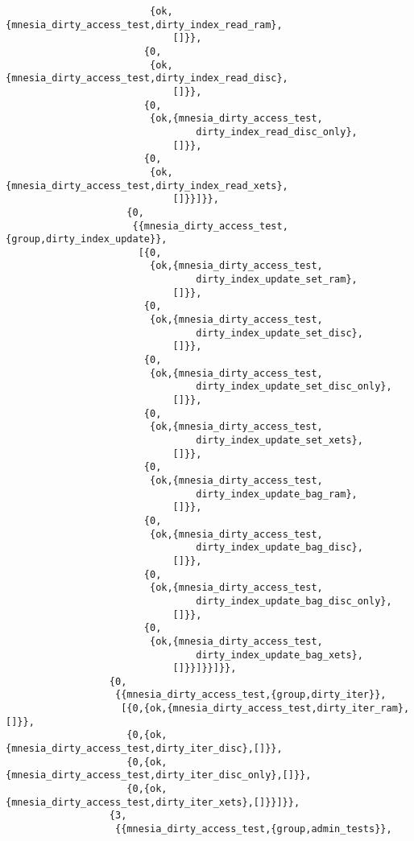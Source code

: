 \begin{verbatim}
                         {ok,{mnesia_dirty_access_test,dirty_index_read_ram},
                             []}},
                        {0,
                         {ok,{mnesia_dirty_access_test,dirty_index_read_disc},
                             []}},
                        {0,
                         {ok,{mnesia_dirty_access_test,
                                 dirty_index_read_disc_only},
                             []}},
                        {0,
                         {ok,{mnesia_dirty_access_test,dirty_index_read_xets},
                             []}}]}},
                     {0,
                      {{mnesia_dirty_access_test,{group,dirty_index_update}},
                       [{0,
                         {ok,{mnesia_dirty_access_test,
                                 dirty_index_update_set_ram},
                             []}},
                        {0,
                         {ok,{mnesia_dirty_access_test,
                                 dirty_index_update_set_disc},
                             []}},
                        {0,
                         {ok,{mnesia_dirty_access_test,
                                 dirty_index_update_set_disc_only},
                             []}},
                        {0,
                         {ok,{mnesia_dirty_access_test,
                                 dirty_index_update_set_xets},
                             []}},
                        {0,
                         {ok,{mnesia_dirty_access_test,
                                 dirty_index_update_bag_ram},
                             []}},
                        {0,
                         {ok,{mnesia_dirty_access_test,
                                 dirty_index_update_bag_disc},
                             []}},
                        {0,
                         {ok,{mnesia_dirty_access_test,
                                 dirty_index_update_bag_disc_only},
                             []}},
                        {0,
                         {ok,{mnesia_dirty_access_test,
                                 dirty_index_update_bag_xets},
                             []}}]}}]}},
                  {0,
                   {{mnesia_dirty_access_test,{group,dirty_iter}},
                    [{0,{ok,{mnesia_dirty_access_test,dirty_iter_ram},[]}},
                     {0,{ok,{mnesia_dirty_access_test,dirty_iter_disc},[]}},
                     {0,{ok,{mnesia_dirty_access_test,dirty_iter_disc_only},[]}},
                     {0,{ok,{mnesia_dirty_access_test,dirty_iter_xets},[]}}]}},
                  {3,
                   {{mnesia_dirty_access_test,{group,admin_tests}},

\end{verbatim}
